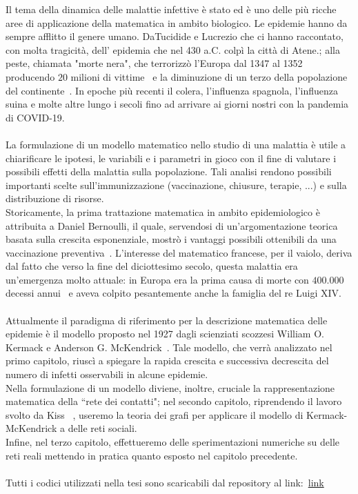 \documentclass[12pt,a4paper,twoside]{report}
\begin{document}
Il tema della dinamica delle malattie infettive \`e stato ed \`e uno delle pi\`u ricche aree di applicazione della matematica in ambito biologico.  Le epidemie hanno  da sempre afflitto il genere umano.  DaTucidide e Lucrezio che ci hanno raccontato,  con molta tragicit\`a,  dell' epidemia che nel 430 a.C.  colp\`i la citt\`a di Atene.; alla  peste,  chiamata "morte nera",   che terrorizz\`o l'Europa dal 1347 al 1352 producendo $20$ milioni di vittime~\cite{ujvari2020storia} e  la diminuzione di  un terzo della popolazione del continente~\cite{alchon2003pest}.  In epoche pi\`u recenti il colera,  l'influenza spagnola,  l'influenza suina e molte altre lungo i  secoli fino ad arrivare ai giorni nostri con la pandemia di COVID-19.\\ \\
La formulazione di un modello matematico nello studio di una malattia \`e utile a chiarificare le ipotesi, le variabili e i parametri in gioco con il fine di valutare i possibili effetti della malattia sulla popolazione. Tali analisi rendono possibili importanti scelte sull'immunizzazione (vaccinazione,  chiusure,  terapie,  ...) e sulla distribuzione di risorse.\\ Storicamente,  la prima trattazione matematica in ambito   epidemiologico \`e attribuita  a Daniel Bernoulli, il quale,  servendosi di un'argomentazione teorica basata sulla crescita esponenziale,  mostr\`o i  vantaggi possibili ottenibili da una vaccinazione preventiva~\cite{Bernoulli}. L'interesse del matematico  francese,  per il vaiolo,  deriva dal fatto che verso la fine del diciottesimo secolo,  questa malattia era  un'emergenza molto attuale: in Europa era la prima causa di morte con $400.000$ decessi annui~\cite{VAIOLO} e aveva colpito pesantemente anche la famiglia del re Luigi XIV.\\ \\
Attualmente il paradigma di riferimento per la descrizione matematica delle epidemie \`e il modello proposto nel 1927 dagli scienziati scozzesi William O. Kermack e Anderson G. McKendrick~\cite{kermack}.  Tale modello,  che verr\`a analizzato  nel primo capitolo,  riusc\`i a spiegare la rapida crescita e successiva decrescita del numero di infetti osservabili in alcune epidemie.\\ 
Nella formulazione di un modello diviene, inoltre,  cruciale la rappresentazione matematica  della ``rete dei contatti"; nel secondo capitolo,  riprendendo il lavoro svolto da Kiss~
\cite{KISS},  useremo la teoria dei grafi per applicare  il modello di Kermack-McKendrick a delle reti sociali.\\
Infine,  nel terzo capitolo,  effettueremo delle sperimentazioni  numeriche su delle reti reali mettendo in pratica quanto esposto nel capitolo precedente.\\ \\
Tutti i codici utilizzati nella tesi sono scaricabili dal  repository al link:~\url{link}
\end{document}
